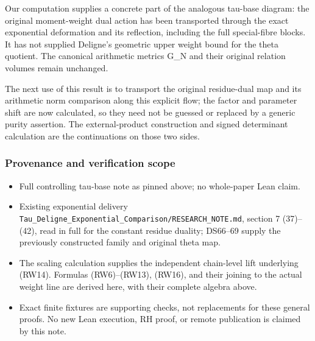 Our computation supplies a concrete part of the analogous tau-base diagram: the original moment-weight dual action has been transported through the exact exponential deformation and its reflection, including the full special-fibre blocks. It has not supplied Deligne's geometric upper weight bound for the theta quotient. The canonical arithmetic metrics G\_N and their original relation volumes remain unchanged.

The next use of this result is to transport the original residue-dual map and its arithmetic norm comparison along this explicit flow; the factor and parameter shift are now calculated, so they need not be guessed or replaced by a generic purity assertion. The external-product construction and signed determinant calculation are the continuations on those two sides.

\subsubsection{Provenance and verification scope}\label{endpoint-f1_reflection--provenance-and-verification-scope}

\begin{itemize}
\tightlist
\item
  Full controlling tau-base note as pinned above; no whole-paper Lean claim.
\item
  Existing exponential delivery \nolinkurl{Tau_Deligne_Exponential_Comparison/RESEARCH_NOTE.md}, section 7 (37)--(42), read in full for the constant residue duality; DS66--69 supply the previously constructed family and original theta map.
\item
  The scaling calculation supplies the independent chain-level lift underlying (RW14). Formulas (RW6)--(RW13), (RW16), and their joining to the actual weight line are derived here, with their complete algebra above.
\item
  Exact finite fixtures are supporting checks, not replacements for these general proofs. No new Lean execution, RH proof, or remote publication is claimed by this note.
\end{itemize}

\endgroup


\endgroup
